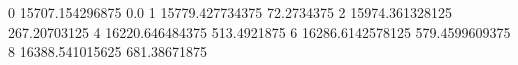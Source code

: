 0 15707.154296875 0.0
1 15779.427734375 72.2734375
2 15974.361328125 267.20703125
4 16220.646484375 513.4921875
6 16286.6142578125 579.4599609375
8 16388.541015625 681.38671875
